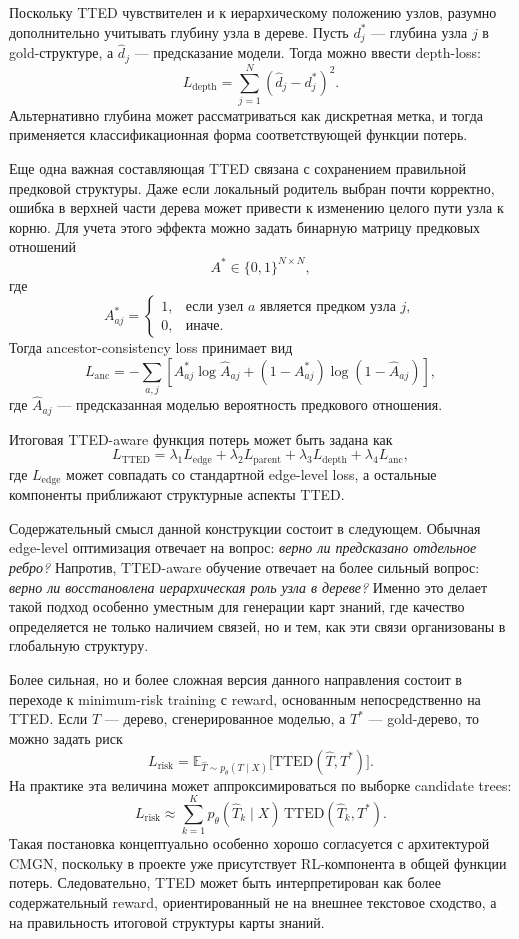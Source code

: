 Поскольку TTED чувствителен и к иерархическому положению узлов, разумно дополнительно учитывать глубину узла в дереве. Пусть $d_j^\ast$ --- глубина узла $j$ в gold-структуре, а $\hat{d}_j$ --- предсказание модели. Тогда можно ввести depth-loss:
\[
L_{\mathrm{depth}}
=
\sum_{j=1}^{N}
(\hat{d}_j - d_j^\ast)^2.
\]
Альтернативно глубина может рассматриваться как дискретная метка, и тогда применяется классификационная форма соответствующей функции потерь.

Еще одна важная составляющая TTED связана с сохранением правильной предковой структуры. Даже если локальный родитель выбран почти корректно, ошибка в верхней части дерева может привести к изменению целого пути узла к корню. Для учета этого эффекта можно задать бинарную матрицу предковых отношений
\[
A^\ast \in \{0,1\}^{N \times N},
\]
где
\[
A^\ast_{aj} =
\begin{cases}
1, & \text{если узел } a \text{ является предком узла } j,\\
0, & \text{иначе.}
\end{cases}
\]
Тогда ancestor-consistency loss принимает вид
\[
L_{\mathrm{anc}}
=
-\sum_{a,j}
\left[
A^\ast_{aj}\log \hat{A}_{aj}
+
(1-A^\ast_{aj})\log(1-\hat{A}_{aj})
\right],
\]
где $\hat{A}_{aj}$ --- предсказанная моделью вероятность предкового отношения.

Итоговая TTED-aware функция потерь может быть задана как
\[
L_{\mathrm{TTED}}
=
\lambda_1 L_{\mathrm{edge}}
+
\lambda_2 L_{\mathrm{parent}}
+
\lambda_3 L_{\mathrm{depth}}
+
\lambda_4 L_{\mathrm{anc}},
\]
где $L_{\mathrm{edge}}$ может совпадать со стандартной edge-level loss, а остальные компоненты приближают структурные аспекты TTED.

Содержательный смысл данной конструкции состоит в следующем. Обычная edge-level оптимизация отвечает на вопрос: \emph{верно ли предсказано отдельное ребро?} Напротив, TTED-aware обучение отвечает на более сильный вопрос: \emph{верно ли восстановлена иерархическая роль узла в дереве?} Именно это делает такой подход особенно уместным для генерации карт знаний, где качество определяется не только наличием связей, но и тем, как эти связи организованы в глобальную структуру.

Более сильная, но и более сложная версия данного направления состоит в переходе к minimum-risk training с reward, основанным непосредственно на TTED. Если $\hat{T}$ --- дерево, сгенерированное моделью, а $T^\ast$ --- gold-дерево, то можно задать риск
\[
L_{\mathrm{risk}}
=
\mathbb{E}_{\hat{T}\sim p_\theta(T\mid X)}
\bigl[
\mathrm{TTED}(\hat{T},T^\ast)
\bigr].
\]
На практике эта величина может аппроксимироваться по выборке candidate trees:
\[
L_{\mathrm{risk}}
\approx
\sum_{k=1}^{K}
p_\theta(\hat{T}_k\mid X)\,
\mathrm{TTED}(\hat{T}_k,T^\ast).
\]
Такая постановка концептуально особенно хорошо согласуется с архитектурой CMGN, поскольку в проекте уже присутствует RL-компонента в общей функции потерь. Следовательно, TTED может быть интерпретирован как более содержательный reward, ориентированный не на внешнее текстовое сходство, а на правильность итоговой структуры карты знаний.

